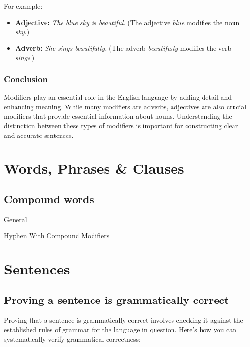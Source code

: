 \documentclass{book}
\begin{document}
For example:
\begin{itemize}
	\item \textbf{Adjective:} \textit{The \textit{blue} sky is beautiful.} (The adjective \textit{blue} modifies the noun \textit{sky}.)
	\item \textbf{Adverb:} \textit{She sings \textit{beautifully}.} (The adverb \textit{beautifully} modifies the verb \textit{sings}.)
\end{itemize}

\section{Conclusion}
Modifiers play an essential role in the English language by adding detail and enhancing meaning. While many modifiers are adverbs, adjectives are also crucial modifiers that provide essential information about nouns. Understanding the distinction between these types of modifiers is important for constructing clear and accurate sentences.

\part{Words, Phrases \& Clauses }

\chapter{Compound words}

\href{https://www.grammarly.com/blog/grammar/open-and-closed-compound-words/}{General}

\href{https://www.grammarly.com/blog/punctuation-capitalization/hyphen-with-compound-modifiers/}{Hyphen With Compound Modifiers}

\part{Sentences}

\chapter{Proving a sentence is grammatically correct}

Proving that a sentence is grammatically correct involves checking it against the established rules of grammar for the language in question. Here’s how you can systematically verify grammatical correctness:
\end{document}

